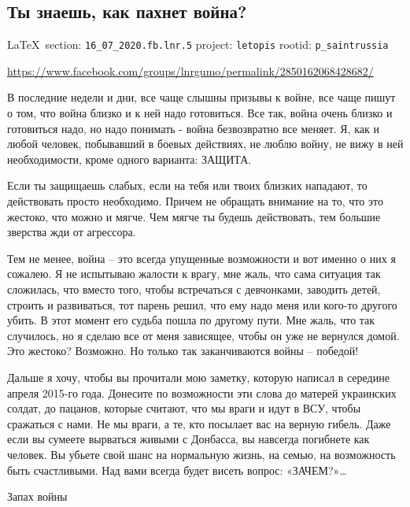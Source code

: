  
 
  
\subsection{Ты знаешь, как пахнет война?}
\vspace{0.5cm}
{\small\LaTeX~section: \verb|16_07_2020.fb.lnr.5| project: \verb|letopis| rootid: \verb|p_saintrussia|}
\vspace{0.5cm}
  
\url{https://www.facebook.com/groups/lnrgumo/permalink/2850162068428682/}

В последние недели и дни, все чаще слышны призывы к войне, все чаще пишут о
том, что война близко и к ней надо готовиться. Все так, война очень близко и
готовиться надо, но надо понимать - война безвозвратно все меняет. Я, как и
любой человек, побывавший в боевых действиях, не люблю войну, не вижу в ней
необходимости, кроме одного варианта: ЗАЩИТА.

Если ты защищаешь слабых, если на тебя или твоих близких нападают, то
действовать просто необходимо. Причем не обращать внимание на то, что это
жестоко, что можно и мягче. Чем мягче ты будешь действовать, тем большие
зверства жди от агрессора.

Тем не менее, война – это всегда упущенные возможности и вот именно о них я
сожалею. Я не испытываю жалости к врагу, мне жаль, что сама ситуация так
сложилась, что вместо того, чтобы встречаться с девчонками, заводить детей,
строить и развиваться, тот парень решил, что ему надо меня или кого-то другого
убить. В этот момент его судьба пошла по другому пути. Мне жаль, что так
случилось, но я сделаю все от меня зависящее, чтобы он уже не вернулся домой.
Это жестоко? Возможно. Но только так заканчиваются войны – победой!

Дальше я хочу, чтобы вы прочитали мою заметку, которую написал в середине
апреля 2015-го года. Донесите по возможности эти слова до матерей украинских
солдат, до пацанов, которые считают, что мы враги и идут в ВСУ, чтобы сражаться
с нами. Не мы враги, а те, кто посылает вас на верную гибель. Даже если вы
сумеете вырваться живыми с Донбасса, вы навсегда погибнете как человек. Вы
убьете свой шанс на нормальную жизнь, на семью, на возможность быть
счастливыми. Над вами всегда будет висеть вопрос: «ЗАЧЕМ?»…

Запах войны

